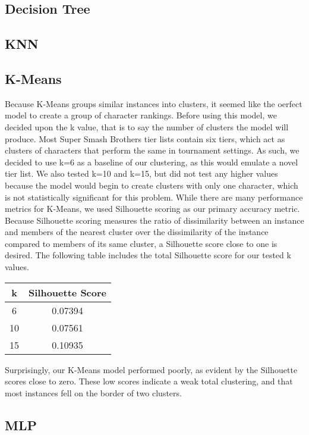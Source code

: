 \documentclass{article}
\begin{document}
\subsection{Decision Tree}
\subsection{KNN}
\subsection{K-Means}

Because K-Means groups similar instances into clusters, it seemed like the oerfect model to create a group of character rankings.
Before using this model, we decided upon the k value, that is to say the number of clusters the model will produce.
Most Super Smash Brothers tier lists contain six tiers, which act as clusters of characters that perform the same in tournament settings.
As such, we decided to use k=6 as a baseline of our clustering, as this would emulate a novel tier list.
We also tested k=10 and k=15, but did not test any higher values because the model would begin to create clusters with only one character, which is not statistically significant for this problem.
While there are many performance metrics for K-Means, we used Silhouette scoring as our primary accuracy metric.
Because Silhouette scoring measures the ratio of dissimilarity between an instance and members of the nearest cluster over the dissimilarity of the instance compared to members of its same cluster, a Silhouette score close to one is desired.
The following table includes the total Silhouette score for our tested k values.

\begin{center}
\begin{tabular}{c c}
\toprule
k & Silhouette Score\\
\midrule
6 & 0.07394\\
10 & 0.07561\\
15 & 0.10935\\
\bottomrule
\end{tabular}
\end{center}

Surprisingly, our K-Means model performed poorly, as evident by the Silhouette scores close to zero.
These low scores indicate a weak total clustering, and that most instances fell on the border of two clusters.

\subsection{MLP}
\end{document}
